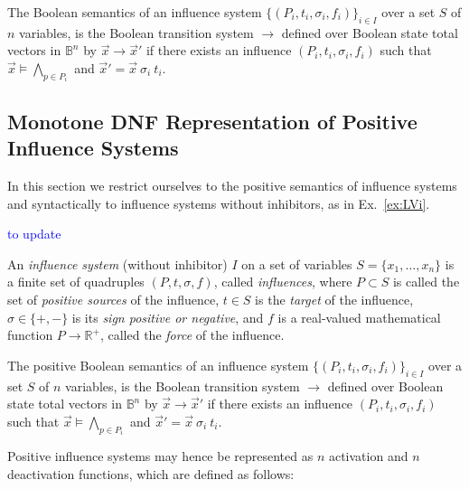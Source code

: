 \documentclass{llncs}
\newcommand{\francois}[1]{\textcolor{blue}{#1}}
\newcommand{\lra}{\longrightarrow}
\begin{document}
\begin{definition}
	The Boolean semantics of an influence system $\{(P_i, t_i, \sigma_i, f_i)\}_{i\in I}$
	over a set $S$ of $n$ variables,
	is the Boolean transition system $\lra$ defined over Boolean state total vectors in $\mathbb{B}^n$
	by
	${\vec x}\lra{\vec x'}$ if there exists an influence $(P_i, t_i, \sigma_i, f_i)$
	such that ${\vec x}\models \bigwedge_{p\in P_i}$
	and ${\vec x'} = {\vec x}\ \sigma_i\ t_i$.
\end{definition}


\subsection{Monotone DNF Representation of Positive Influence Systems}


In this section we restrict ourselves to the positive semantics of influence systems
and syntactically to influence systems without inhibitors, as in Ex.~\ref{ex:LVi}.

\francois{to update}

\begin{definition}
	
	An \emph{influence system} (without inhibitor) $I$ on a set of variables $S=\{x_1,\dots,x_n\}$ is a
	finite set of quadruples $(P, t, \sigma, f)$, called \emph{influences}, where
	$P\subset S$ is called the set of \emph{positive sources} of the influence,
	$t\in S$ is the \emph{target} of the influence,
	$\sigma\in\{+,-\}$ is its \emph{sign positive or negative}, and $f$ is a
	real-valued mathematical function $P\to\mathbb{R^+}$, called the
	\emph{force} of the influence.
	
\end{definition}

\begin{definition}
	The positive Boolean semantics of an influence system $\{(P_i, t_i, \sigma_i, f_i)\}_{i\in I}$
	over a set $S$ of $n$ variables,
	is the Boolean transition system $\lra$ defined over Boolean state total vectors in $\mathbb{B}^n$
	by
	${\vec x}\lra{\vec x'}$ if there exists an influence $(P_i, t_i, \sigma_i, f_i)$
	such that ${\vec x}\models \bigwedge_{p\in P_i}$
	and ${\vec x'} = {\vec x}\ \sigma_i\ t_i$.
\end{definition}

Positive influence systems may hence be represented as $n$ activation and $n$ deactivation functions, which are defined as follows:
\end{document}
